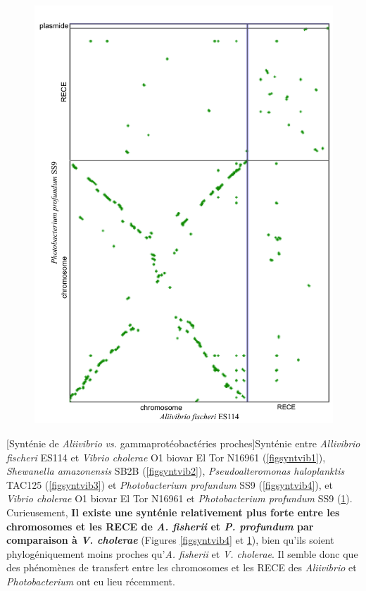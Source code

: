 \begin{figure}[H]
\centering
	\begin{minipage}{0.5\textwidth}
   		\includegraphics[width=\textwidth]{./img/synteny/new/fig8_12d.png}
   		\label{figsyntvib5}
    \end{minipage} 
\end{figure}      
      
[Synténie de \textit{Aliivibrio} \textit{vs.} gammaprotéobactéries proches]{Synténie entre \textit{Allivibrio fischeri} ES114 et \textit{Vibrio cholerae} O1 biovar El Tor N16961 (\ref{figsyntvib1}), \textit{Shewanella amazonensis} SB2B (\ref{figsyntvib2}), \textit{Pseudoalteromonas haloplanktis} TAC125 (\ref{figsyntvib3}) et \textit{Photobacterium profundum} SS9 (\ref{figsyntvib4}), et  \textit{Vibrio cholerae} O1 biovar El Tor N16961 et \textit{Photobacterium profundum} SS9 (\ref{figsyntvib5}).}\label{figsyntvib}
\vspace{1cm}
Curieusement, \textbf{Il existe une synténie relativement plus forte entre les chromosomes et les RECE de \textit{A. fisherii} et \textit{P. profundum} par comparaison à \textit{V. cholerae}} (Figures \ref{figsyntvib4} et \ref{figsyntvib5}), bien qu'ils soient phylogéniquement moins proches qu'\textit{A. fisherii} et \textit{V. cholerae}. Il semble donc que des phénomènes de transfert entre les chromosomes et les RECE des \textit{Aliivibrio} et \textit{Photobacterium} ont eu lieu récemment.

